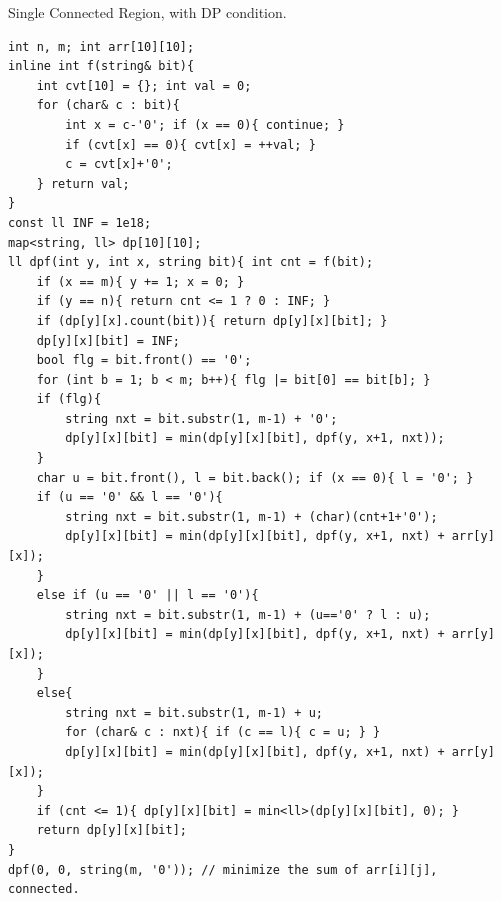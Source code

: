 Single Connected Region, with DP condition.

\begin{verbatim}
int n, m; int arr[10][10];
inline int f(string& bit){
	int cvt[10] = {}; int val = 0;
	for (char& c : bit){
		int x = c-'0'; if (x == 0){ continue; }
		if (cvt[x] == 0){ cvt[x] = ++val; }
		c = cvt[x]+'0';  
	} return val;
}
const ll INF = 1e18;
map<string, ll> dp[10][10];
ll dpf(int y, int x, string bit){ int cnt = f(bit);
	if (x == m){ y += 1; x = 0; }
	if (y == n){ return cnt <= 1 ? 0 : INF; }
	if (dp[y][x].count(bit)){ return dp[y][x][bit]; }
	dp[y][x][bit] = INF;
	bool flg = bit.front() == '0';
	for (int b = 1; b < m; b++){ flg |= bit[0] == bit[b]; }
	if (flg){
		string nxt = bit.substr(1, m-1) + '0';
		dp[y][x][bit] = min(dp[y][x][bit], dpf(y, x+1, nxt));
	}
	char u = bit.front(), l = bit.back(); if (x == 0){ l = '0'; }
	if (u == '0' && l == '0'){
		string nxt = bit.substr(1, m-1) + (char)(cnt+1+'0');
		dp[y][x][bit] = min(dp[y][x][bit], dpf(y, x+1, nxt) + arr[y][x]);
	}
	else if (u == '0' || l == '0'){
		string nxt = bit.substr(1, m-1) + (u=='0' ? l : u);
		dp[y][x][bit] = min(dp[y][x][bit], dpf(y, x+1, nxt) + arr[y][x]);
	}
	else{
		string nxt = bit.substr(1, m-1) + u;
		for (char& c : nxt){ if (c == l){ c = u; } }
		dp[y][x][bit] = min(dp[y][x][bit], dpf(y, x+1, nxt) + arr[y][x]);
	}
	if (cnt <= 1){ dp[y][x][bit] = min<ll>(dp[y][x][bit], 0); }
	return dp[y][x][bit];
}
dpf(0, 0, string(m, '0')); // minimize the sum of arr[i][j], connected.
\end{verbatim}